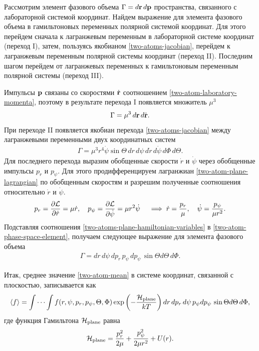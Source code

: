 Рассмотрим элемент фазового объема $\Gamma = d\mathbf{r} \, d\mathbf{p}$ пространства, связанного с лабораторной системой координат. Найдем выражение для элемента фазового объема в гамильтоновых переменных полярной системой координат. Для этого перейдем сначала к лагранжевым переменным в лабораторной системе координат (переход I), затем, пользуясь якобианом \eqref{two-atoms-jacobian}, перейдем к лагранжевым переменным полярной системы координат (переход II). Последним шагом перейдем от лагранжевых переменных к гамильтоновым переменным полярной системы (переход III). \par
    Импульсы $\mathbf{p}$ связаны со скоростями $\dot{\mathbf{r}}$ соотношением \eqref{two-atom-laboratory-momenta}, поэтому в результате перехода I появляется множитель $\mu^3$
\begin{gather}
    \Gamma = \mu^3 \, d\mathbf{r} \, d\dot{\mathbf{r}}.
\end{gather}
    При переходе II появляется якобиан перехода \eqref{two-atoms-jacobian} между лагранжевыми переменными двух координатных систем 
\begin{gather}
    \Gamma =  \mu^3 r^4 \dot{\psi} \sin \Theta \, dr \, d\psi \, d\dot{r} \, d\dot{\psi} \, d\Phi \, d\Theta. \label{two-atom-phase-space-element}
\end{gather}
Для последнего перехода выразим обобщенные скорости $\dot{r}$ и $\dot{\psi}$ через обобщенные импульсы $p_r$ и $p_\psi$. Для этого продифференцируем лагранжиан \eqref{two-atom-plane-lagrangian} по обобщенным скоростям и разрешим полученные соотношения относительно $\dot{r}$ и $\dot{\psi}$. 
\begin{gather}
    p_r = \frac{\partial \mathcal{L}}{\partial \dot{r}} = \mu \dot{r}, \quad p_\psi = \frac{\partial \mathcal{L}}{\partial \dot{\psi}} = \mu r^2 \dot{\psi} \quad \implies \dot{r} = \frac{p_r}{\mu}, \quad \dot{\psi} = \frac{p_\psi}{\mu r^2}. \label{two-atoms-plane-hamiltonian-variables}
\end{gather}
Подставляя соотношения \eqref{two-atoms-plane-hamiltonian-variables} в \eqref{two-atom-phase-space-element}, получаем следующее выражение для элемента фазового объема
\begin{gather}
    \Gamma = dr \, d\psi \, dp_r \, p_\psi \, dp_\psi \, \sin \Theta d\Theta \, d\Phi.
\end{gather}

Итак, среднее значение \eqref{two-atom-mean} в системе координат, связанной с плоскостью, записывается как 
\begin{gather}
    \langle  f  \rangle = \idotsint f(r, \psi, p_r, p_\psi, \Theta, \Phi) \exp \left( -\frac{\mathcal{H}_\text{plane}}{kT} \right) dr \, d p_r \, d\psi \, p_\psi dp_\psi \, \sin \Theta d\Theta \, d\Phi, \label{two-atom-mean-plane1}
\end{gather}
%
где функция Гамильтона $\mathcal{H}_\text{plane}$ равна
\begin{gather}
    \mathcal{H}_\text{plane} = \frac{p_r^2}{2 \mu} + \frac{p_\psi^2}{2 \mu r^2} + U(r).
\end{gather}

